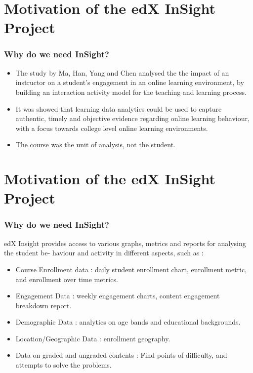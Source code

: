 \documentclass[12pt,xcolor=dvipsnames]{beamer}
\begin{document}
\section{Motivation of the edX InSight Project}
\begin{frame}[t]
\frametitle{Why do we need InSight?}

\begin{itemize}
\item The study by Ma, Han, Yang and Chen analysed the the impact of an instructor on a student’s engagement in an online learning environment, by building an interaction activity model for the teaching and learning process.

\item It was showed that learning data analytics could be used
to capture authentic, timely and objective evidence regarding online learning behaviour, with a focus
towards college level online learning environments.

\item The course was the unit of analysis, not the student.

\end{itemize}
\end{frame}
\section{Motivation of the edX InSight Project}
\begin{frame}[t]
\frametitle{Why do we need InSight?}

edX Insight provides access to various graphs, metrics and reports for analysing the student be-
haviour and activity in different aspects, such as :

\begin{itemize}

\item Course Enrollment data : daily student enrollment chart, enrollment metric, and enrollment over time metrics.

\item Engagement Data : weekly engagement charts, content engagement breakdown report.
\item Demographic Data : analytics on age bands and educational backgrounds.
\item Location/Geographic Data : enrollment geography.
\item Data on graded and ungraded contents : Find points of difficulty, and attempts to solve the problems.

\end{itemize}
\end{frame}
\end{document}
